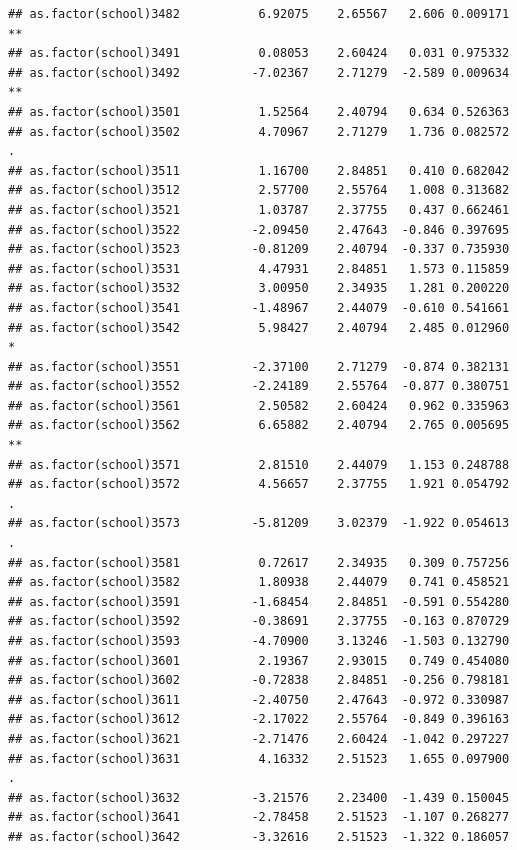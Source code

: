 \documentclass[ignorenonframetext,]{beamer}
\begin{document}
\begin{frame}[fragile]{}
\begin{verbatim}
## as.factor(school)3482           6.92075    2.65567   2.606 0.009171 ** 
## as.factor(school)3491           0.08053    2.60424   0.031 0.975332    
## as.factor(school)3492          -7.02367    2.71279  -2.589 0.009634 ** 
## as.factor(school)3501           1.52564    2.40794   0.634 0.526363    
## as.factor(school)3502           4.70967    2.71279   1.736 0.082572 .  
## as.factor(school)3511           1.16700    2.84851   0.410 0.682042    
## as.factor(school)3512           2.57700    2.55764   1.008 0.313682    
## as.factor(school)3521           1.03787    2.37755   0.437 0.662461    
## as.factor(school)3522          -2.09450    2.47643  -0.846 0.397695    
## as.factor(school)3523          -0.81209    2.40794  -0.337 0.735930    
## as.factor(school)3531           4.47931    2.84851   1.573 0.115859    
## as.factor(school)3532           3.00950    2.34935   1.281 0.200220    
## as.factor(school)3541          -1.48967    2.44079  -0.610 0.541661    
## as.factor(school)3542           5.98427    2.40794   2.485 0.012960 *  
## as.factor(school)3551          -2.37100    2.71279  -0.874 0.382131    
## as.factor(school)3552          -2.24189    2.55764  -0.877 0.380751    
## as.factor(school)3561           2.50582    2.60424   0.962 0.335963    
## as.factor(school)3562           6.65882    2.40794   2.765 0.005695 ** 
## as.factor(school)3571           2.81510    2.44079   1.153 0.248788    
## as.factor(school)3572           4.56657    2.37755   1.921 0.054792 .  
## as.factor(school)3573          -5.81209    3.02379  -1.922 0.054613 .  
## as.factor(school)3581           0.72617    2.34935   0.309 0.757256    
## as.factor(school)3582           1.80938    2.44079   0.741 0.458521    
## as.factor(school)3591          -1.68454    2.84851  -0.591 0.554280    
## as.factor(school)3592          -0.38691    2.37755  -0.163 0.870729    
## as.factor(school)3593          -4.70900    3.13246  -1.503 0.132790    
## as.factor(school)3601           2.19367    2.93015   0.749 0.454080    
## as.factor(school)3602          -0.72838    2.84851  -0.256 0.798181    
## as.factor(school)3611          -2.40750    2.47643  -0.972 0.330987    
## as.factor(school)3612          -2.17022    2.55764  -0.849 0.396163    
## as.factor(school)3621          -2.71476    2.60424  -1.042 0.297227    
## as.factor(school)3631           4.16332    2.51523   1.655 0.097900 .  
## as.factor(school)3632          -3.21576    2.23400  -1.439 0.150045    
## as.factor(school)3641          -2.78458    2.51523  -1.107 0.268277    
## as.factor(school)3642          -3.32616    2.51523  -1.322 0.186057    

\end{verbatim}
\end{frame}
\end{document}
